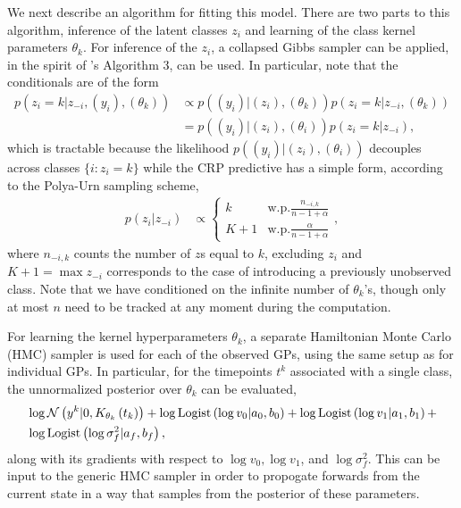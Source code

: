 \documentclass[14pt]{extreport}
\begin{document}
We next describe an algorithm for fitting this model. There are two parts to
this algorithm, inference of the latent classes $z_i$ and learning of the class
kernel parameters $\theta_k$. For inference of the $z_i$, a collapsed Gibbs
sampler can be applied, in the spirit of \citep{neal2000markov}'s Algorithm 3,
can be used. In particular, note that the conditionals are of the form
\begin{align}
  p\left(z_i = k \vert z_{-i}, \left(y_i\right), \left(\theta_k\right)\right) &\propto p\left(\left(y_i\right) \vert \left(z_i\right),  \left(\theta_k\right)\right)
  p\left(z_i = k \vert z_{-i}, \left(\theta_k\right)\right) \nonumber \\
  &= p\left(\left(y_i\right) \vert \left(z_i\right), \left(\theta_i\right)\right)p\left(z_i = k \vert z_{-i}\right), \label{eq:igp_conditional}
\end{align}
which is tractable because the likelihood $p\left(\left(y_i\right) \vert
\left(z_i\right), \left(\theta_i\right)\right)$ decouples across classes $\{i :
z_i = k\}$ while the CRP predictive has a simple form, according to the
Polya-Urn sampling scheme,
\begin{align*}
  p\left(z_i\vert z_{-i}\right) &\propto \begin{cases}
    k &\text{w.p.} \frac{n_{-i, k}}{n - 1 + \alpha} \\
    K + 1 &\text{w.p.} \frac{\alpha}{n - 1 + \alpha}
    \end{cases},
\end{align*}
where $n_{-i, k}$ counts the number of $z$s equal to $k$, excluding $z_i$ and $K
+ 1 = \max{z_{-i}}$ corresponds to the case of introducing a previously
unobserved class. Note that we have conditioned on the infinite number
of $\theta_k$'s, though only at most $n$ need to be tracked at any moment during
the computation.

For learning the kernel hyperparameters $\theta_k$, a separate Hamiltonian Monte
Carlo (HMC) sampler is used for each of the observed GPs, using the same setup
as \citep{rasmussen2006gaussian} for individual GPs. In particular, for the
timepoints $t^k$ associated with a single class, the unnormalized posterior over
$\theta_k$ can be evaluated,
\begin{align*}
  &\log \mathcal{N}\left(y^k \vert 0, K_{\theta_k}\left(t_k\right)\right) +
  \log \text{Logist}\left(\log v_0 \vert a_0, b_0\right) +
  \log \text{Logist}\left(\log v_1 \vert a_1, b_1\right) +\\
  &\log \text{Logist}\left(\log \sigma_f^2 \vert a_f, b_f\right),
\end{align*}
along with its gradients with respect to $\log v_0, \log v_1$, and $\log
\sigma_f^2$. This can be input to the generic HMC sampler in order to propogate
forwards from the current state in a way that samples from the posterior of
these parameters.
\end{document}
